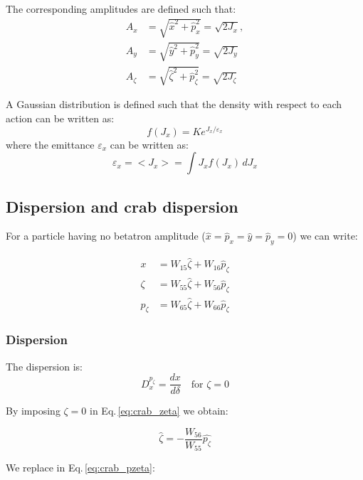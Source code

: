The corresponding amplitudes are defined such that:
\begin{align}
A_x &= \sqrt{\hat{x}^2 + \hat{p}^2_x} = \sqrt{2J_x}, \label{eq:ampl_x}\\
A_y &= \sqrt{\hat{y}^2 + \hat{p}^2_y} = \sqrt{2J_y}\\
A_\zeta &= \sqrt{\hat{\zeta}^2 + \hat{p}^2_\zeta} = \sqrt{2J_\zeta}
\end{align}

A Gaussian distribution is defined such that the density with respect to each action can be written as:
\begin{equation}
f(J_x) = K e^{J_x/\varepsilon_x}
\end{equation}
where the emittance $\varepsilon_x$ can be written as:
\begin{equation}
\varepsilon_x = <J_x> = \int J_x f(J_x) \,dJ_x
\end{equation}


\subsection{Dispersion and crab dispersion}

For a particle having no betatron amplitude ($\hat{x} = \hat{p}_x =\hat{y} =\hat{p}_y=0$) we can write:

\begin{align}
x &= W_{15}\hat{\zeta} + W_{16}\hat{p}_\zeta \label{eq:crab_x}\\
\zeta &= W_{55}\hat{\zeta} + W_{56}\hat{p}_\zeta \label{eq:crab_zeta}\\
p_\zeta &= W_{65}\hat{\zeta} + W_{66}\hat{p}_\zeta \label{eq:crab_pzeta}
\end{align}


\subsubsection{Dispersion}
The dispersion is:
\begin{equation}
D_{x}^{p_\zeta} = \frac{dx}{d \delta} \quad \text{for } \zeta=0
\end{equation}

By imposing $\zeta = 0$ in Eq.\,\ref{eq:crab_zeta} we obtain:

\begin{equation}
\hat{\zeta} = - \frac{W_{56}}{W_{55}}\hat{p_\zeta}
\label{eq:crab_zeta_pzeta}
\end{equation}

We replace in Eq.\,\ref{eq:crab_pzeta}:

